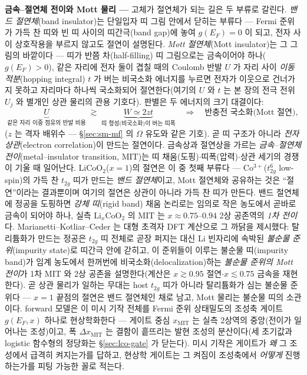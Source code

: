 \begin{bgbox}
\textbf{금속--절연체 전이와 Mott 물리 ---} 고체가 절연체가 되는 길은 두 부류로 갈린다.
\emph{밴드 절연체}(band insulator)는 단일입자 띠 그림 안에서 닫히는 부류다 --- Fermi 준위가 가득 찬 띠와
빈 띠 사이의 띠간극(band gap)에 놓여 $g(E_F){=}0$ 이 되고, 전자 사이 상호작용을 부르지 않고도 절연이
설명된다. \emph{Mott 절연체}(Mott insulator)는 그 그림의 바깥이다 --- 띠가 반쯤 차(half-filling) 띠
그림으로는 금속이어야 하나($g(E_F){>}0$), 같은 자리에 전자 둘이 겹칠 때의 Coulomb 반발 $U$ 가 자리 사이
\emph{이동적분}(hopping integral) $t$ 가 버는 비국소화 에너지를 누르면 전자가 이웃으로 건너가지 못하고
자리마다 하나씩 국소화되어 절연한다(여기의 $U$ 와 $t$ 는 본 장의 전극 전위 $U_j$ 와 별개인 상관 물리의
관용 기호다). 판별은 두 에너지의 크기 대결이다:
\begin{equation}
\underbrace{U}_{\text{같은 자리 이중 점유의 반발 비용}}
\;\gtrsim\;
\underbrace{W\simeq 2zt}_{\text{띠 형성(비국소화)이 버는 띠폭}}
\quad\Longrightarrow\quad
\text{반충전 국소화(Mott 절연)},
\label{eq:lco-mottcrit}
\end{equation}
($z$ 는 격자 배위수 --- \S\ref{sec:sm-mf} 의 $\Omega$ 유도와 같은 기호). 곧 띠 구조가
아니라 \emph{전자 상관}(electron correlation)이 만드는 절연이다\cite{mott1968,imada1998}. 금속상과 절연상을
가르는 \emph{금속--절연체 전이}(metal--insulator transition, MIT)는 띠 채움(도핑)$\cdot$띠폭(압력)$\cdot$상관
세기의 경쟁이 기울 때 일어난다\cite{imada1998}. $\mathrm{LiCoO_2}$($x{=}1$)의 절연은 이 중 첫째 부류다 ---
Co$^{3+}$($t_{2g}^6$ low-spin)의 가득 찬 $t_{2g}$ 띠가 만드는 \emph{밴드 절연체}이고\cite{menetrier1999},
Mott 절연체와 공유하는 것은 ``절연''이라는 결과뿐이며 여기의 절연은 상관이 아니라 가득 찬 띠가 만든다.
밴드 절연체에 정공을 도핑하면 \emph{강체 띠}(rigid band) 채움 논리로는 임의로 작은 농도에서 곧바로 금속이 되어야 하나, 실측
$\mathrm{Li}_x\mathrm{CoO_2}$ 의 MIT 는 $x\approx0.75$--$0.94$ 2상 공존역의 \emph{1차
전이}다\cite{menetrier1999,reimers1992,motohashi2009}. Marianetti--Kotliar--Ceder 는 대형 초격자 DFT 계산으로
그 까닭을 제시했다: 탈리튬화가 만드는 정공은 $t_{2g}$ 띠 전체로 곧장 퍼지는 대신 Li 빈자리에 속박된
\emph{불순물 준위}(impurity state)로 띠간극 안에 갇히고, 이 준위들이 이루는 불순물 띠(impurity band)가 임계
농도에서 한꺼번에 비국소화(delocalization)하는 \emph{불순물 준위의 Mott 전이}가 1차 MIT 와 2상 공존을
설명한다\cite{marianetti2004}(계산은 $x\gtrsim0.95$ 절연$\cdot$$x\lesssim0.75$ 금속을 재현한다). 곧 상관
물리가 일하는 무대는 host $t_{2g}$ 띠가 아니라 탈리튬화가 심는 불순물 준위다 --- $x{=}1$ 끝점의 절연은 밴드
절연체인 채로 남고, Mott 물리는 불순물 띠의 소관이다. forward 모델은 이 미시 기작 전체를 Fermi 준위
상태밀도의 조성축 게이트 $g(E_F,x)$ 하나로 현상학화한다 --- 게이트 중심 $x_\mathrm{MIT}$ 는 실측 2상역의
중앙(전이가 일어나는 조성)이고, 폭 $\Delta x_\mathrm{MIT}$ 는 결함이 흩뜨리는 발현 조성의 분산이다(세
초기값과 logistic 함수형의 정당화는 \S\ref{sec:lco-gate} 가 닫는다). 미시 기작은 게이트가 \emph{왜} 그
조성에서 급격히 켜지는가를 답하고, 현상학 게이트는 그 켜짐이 조성축에서 \emph{어떻게} 진행하는가를 피팅
가능한 꼴로 적는다.
\end{bgbox}

